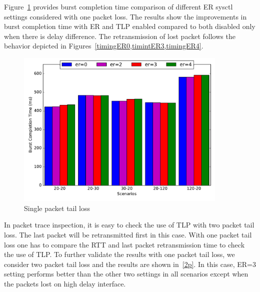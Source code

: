 \documentclass[12pt,draftcls,onecolumn]{IEEEtran}
\begin{document}
Figure~\ref{1p} provides burst completion time comparison of different ER sysctl settings considered with one packet loss. The results show the improvements
in burst completion time with ER and TLP enabled compared to both disabled only when there is delay difference. The retransmission of lost packet follows the behavior 
depicted in Figures~\ref{timingER0,timintER3,timingER4}.

\begin{figure}[!ht]
\begin{center}
\includegraphics[angle=0, width=0.9\textwidth,natwidth=578.16,natheight=433.62]{plots/1P.pdf}
\caption{Single packet tail loss}\label{1p}
\end{center}
\end{figure}

In packet trace inspection, it is easy to check the use of TLP with two packet tail loss. The last packet will be retransmitted first in this case.
With one packet tail loss one has to compare the RTT and last packet retransmission time to check the use of TLP.
To further validate the results with one packet tail loss, we consider two packet tail loss and the results are shown in~\ref{2p}.
In this case, ER=3 setting performs better than the other two settings in all scenarios except when the packets lost on high delay interface. 
\end{document}
